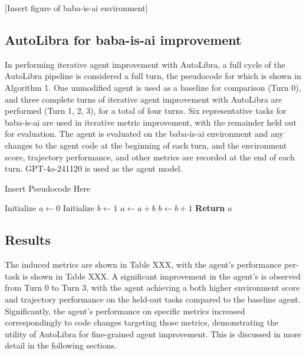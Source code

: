 [Insert figure of baba-is-ai environment]

\subsection{AutoLibra for baba-is-ai improvement}

In performing iterative agent improvement with AutoLibra, a full cycle of the AutoLibra pipeline is considered a full turn, the pseudocode for which is shown in Algorithm 1. One unmodified agent is used as a baseline for comparison (Turn 0), and three complete turns of iterative agent improvement with AutoLibra are performed (Turn 1, 2, 3), for a total of four turns. Six representative tasks for baba-is-ai are used in iterative metric improvement, with the remainder held out for evaluation. The agent is evaluated on the baba-is-ai environment and any changes to the agent code at the beginning of each turn, and the environment score, trajectory performance, and other metrics are recorded at the end of each turn. GPT-4o-241120 is used as the agent model.


\begin{algorithm}
    \caption{Insert Pseudocode Here}
    \begin{algorithmic}[1]
    \State Initialize $a \gets 0$
    \State Initialize $b \gets 1$
        \State $a \gets a + b$
        \State $b \gets b + 1$
    \EndFor
    \State \textbf{Return} $a$
    \end{algorithmic}
\end{algorithm}



\subsection{Results}

The induced metrics are shown in Table XXX, with the agent's performance per-task is shown in Table XXX. A significant improvement in the agent's is observed from Turn 0 to Turn 3, with the agent achieving a both higher environment score and trajectory performance on the held-out tasks compared to the baseline agent. Significantly, the agent's performance on specific metrics increased correspondingly to code changes targeting those metrics, demonstrating the utility of AutoLibra for fine-grained agent improvement. This is discussed in more detail in the following sections.

